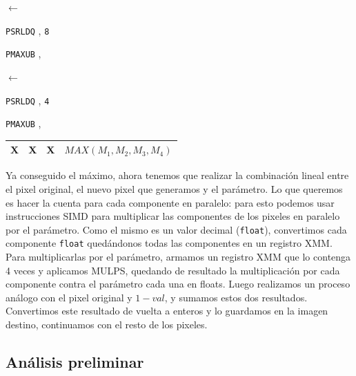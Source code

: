 \begin{center}
	 

	 $\leftarrow$ 

	\texttt{PSRLDQ} , \texttt{8} \hfill

	 

	\texttt{PMAXUB} ,  \hfill

	 

	 $\leftarrow$ 

	\texttt{PSRLDQ} , \texttt{4} \hfill

	 

	\texttt{PMAXUB} ,  \hfill

	\vspace{0.1cm}
	\begin{tabular}{|C{1cm}|C{1cm}|C{1cm}|C{3.8cm}|}\hline
		X & X & X & $MAX(M_1,M_2,M_3,M_4)$ \\ \hline
	\end{tabular}
	\vspace{0.1cm}
\end{center}

Ya conseguido el máximo, ahora tenemos que realizar la combinación lineal entre el pixel original, el nuevo pixel que generamos y el parámetro. Lo que queremos es hacer la cuenta para cada componente en paralelo: para esto podemos usar instrucciones SIMD para multiplicar las componentes de los pixeles en paralelo por el parámetro. Como el mismo es un valor decimal (\texttt{float}), convertimos cada componente \texttt{float} quedándonos todas las componentes en un registro XMM. Para multiplicarlas por el parámetro, armamos un registro XMM que lo contenga 4 veces y aplicamos MULPS, quedando de resultado la multiplicación por cada componente contra el parámetro cada una en floats. Luego realizamos un proceso análogo con el pixel original y $1 - val$, y sumamos estos dos resultados. Convertimos este resultado de vuelta a enteros y lo guardamos en la imagen destino, continuamos con el resto de los pixeles.

\subsection{Análisis preliminar}

